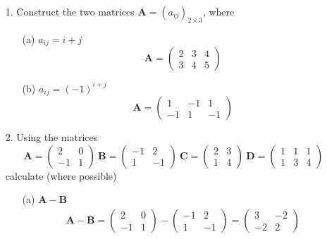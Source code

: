 \documentclass{article}
\begin{document}
\begin{enumerate}
    \item[1. ] Construct the two matrices $\mathbf{A} = (a_{ij})_{2 \times 3}$, where
        \begin{enumerate}
            \item[(a)] $a_{ij} = i + j$
            $$ \mathbf{A} = \begin{pmatrix}2 &3 &4 \\3 &4 &5 \end{pmatrix} $$
            \item[(b)] $a_{ij} = (-1)^{i+j}$
            $$ \mathbf{A} = \begin{pmatrix}1 &-1 &1 \\-1 &1 &-1 \end{pmatrix} $$
        \end{enumerate}
        
    \item[2. ] Using the matrices
    $$ \mathbf{A} = \begin{pmatrix}2 &0\\-1 &1\end{pmatrix}\ 
       \mathbf{B} = \begin{pmatrix}-1 &2\\1 &-1\end{pmatrix}\
       \mathbf{C} = \begin{pmatrix}2 &3\\1 &4\end{pmatrix}\
       \mathbf{D} = \begin{pmatrix}1 &1 &1\\1 &3 &4\end{pmatrix}\
    $$
    calculate (where possible)
        \begin{enumerate}
            \item[(a)] $\mathbf{A} - \mathbf{B}$
            \begin{align*}
                \mathbf{A} - \mathbf{B} 
                =  \begin{pmatrix}2 &0\\-1 &1\end{pmatrix} 
                - \begin{pmatrix}-1 &2\\1 &-1\end{pmatrix} 
                = \begin{pmatrix}3 &-2\\-2 &2\end{pmatrix}
            \end{align*}
            

\end{enumerate}
\end{enumerate}
\end{document}
